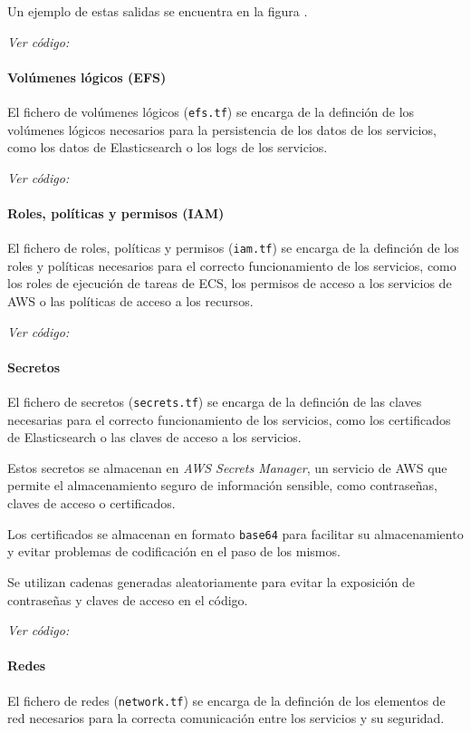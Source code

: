 Un ejemplo de estas salidas se encuentra en la figura
.

\textit{Ver código: }


\paragraph{Volúmenes lógicos (EFS)}
El fichero de volúmenes lógicos (\texttt{efs.tf}) se encarga de la definción de
los volúmenes lógicos necesarios para la persistencia de los datos de los
servicios, como los datos de Elasticsearch o los logs de los servicios.

\textit{Ver código: }


\paragraph{Roles, políticas y permisos (IAM)}
El fichero de roles, políticas y permisos (\texttt{iam.tf}) se encarga de la
definción de los roles y políticas necesarios para el correcto funcionamiento
de los servicios, como los roles de ejecución de tareas de ECS, los permisos
de acceso a los servicios de AWS o las políticas de acceso a los recursos.

\textit{Ver código: }


\paragraph{Secretos}
El fichero de secretos (\texttt{secrets.tf}) se encarga de la definción de las
claves necesarias para el correcto funcionamiento de los servicios, como los
certificados de Elasticsearch o las claves de acceso a los servicios.

Estos secretos se almacenan en \textit{AWS Secrets Manager}, un servicio de AWS
que permite el almacenamiento seguro de información sensible, como contraseñas,
claves de acceso o certificados.

Los certificados se almacenan en formato \texttt{base64} para facilitar su
almacenamiento y evitar problemas de codificación en el paso de los mismos.

Se utilizan cadenas generadas aleatoriamente para evitar la exposición de
contraseñas y claves de acceso en el código.

\textit{Ver código: }


\paragraph{Redes}
El fichero de redes (\texttt{network.tf}) se encarga de la definción de los
elementos de red necesarios para la correcta comunicación entre los servicios y
su seguridad.

